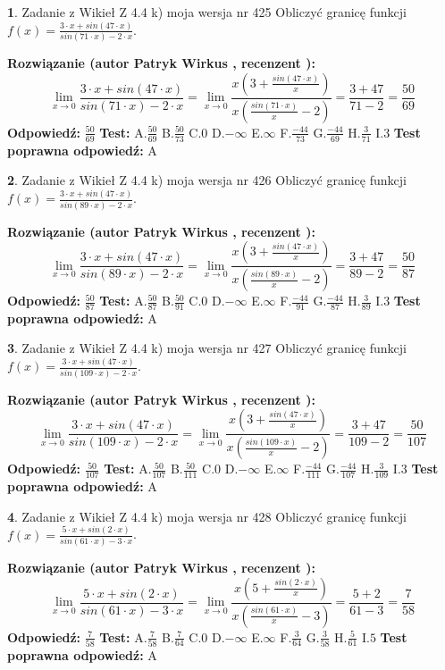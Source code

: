 \documentclass[12pt, a4paper]{article}
\theoremstyle{definition} %
\newtheorem{zad}{}
\newcommand{\zadStart}[1]{\begin{zad}#1\newline}
\newcommand{\zadStop}{\end{zad}}
\newcommand{\rozwStart}[2]{\noindent \textbf{Rozwiązanie (autor #1 , recenzent #2): }\newline}
\newcommand{\rozwStop}{\newline}
\newcommand{\odpStart}{\noindent \textbf{Odpowiedź:}\newline}
\newcommand{\odpStop}{\newline}
\newcommand{\testStart}{\noindent \textbf{Test:}\newline}
\newcommand{\testStop}{\newline}
\newcommand{\kluczStart}{\noindent \textbf{Test poprawna odpowiedź:}\newline}
\newcommand{\kluczStop}{\newline}
\begin{document}
\zadStart{Zadanie z Wikieł Z 4.4 k) moja wersja nr 425}
Obliczyć granicę funkcji $f(x)=\frac{3\cdot x +sin(47\cdot x)}{sin(71\cdot x) -2\cdot x}$.
\zadStop
\rozwStart{Patryk Wirkus}{}
$$\lim\limits_{x\to 0}\frac{3\cdot x +sin(47\cdot x)}{sin(71\cdot x) -2\cdot x}
=\lim\limits_{x\to 0}\frac{x(3+\frac{sin(47\cdot x)}{x})}{x(\frac{sin(71\cdot x)}{x}-2)}
=\frac{3+47}{71-2} = \frac{50}{69}$$
\rozwStop
\odpStart
$\frac{50}{69}$
\odpStop
\testStart
A.$\frac{50}{69}$
B.$\frac{50}{73}$
C.$0$
D.$-\infty$
E.$\infty$
F.$\frac{-44}{73}$
G.$\frac{-44}{69}$
H.$\frac{3}{71}$
I.$3$
\testStop
\kluczStart
A
\kluczStop



\zadStart{Zadanie z Wikieł Z 4.4 k) moja wersja nr 426}
Obliczyć granicę funkcji $f(x)=\frac{3\cdot x +sin(47\cdot x)}{sin(89\cdot x) -2\cdot x}$.
\zadStop
\rozwStart{Patryk Wirkus}{}
$$\lim\limits_{x\to 0}\frac{3\cdot x +sin(47\cdot x)}{sin(89\cdot x) -2\cdot x}
=\lim\limits_{x\to 0}\frac{x(3+\frac{sin(47\cdot x)}{x})}{x(\frac{sin(89\cdot x)}{x}-2)}
=\frac{3+47}{89-2} = \frac{50}{87}$$
\rozwStop
\odpStart
$\frac{50}{87}$
\odpStop
\testStart
A.$\frac{50}{87}$
B.$\frac{50}{91}$
C.$0$
D.$-\infty$
E.$\infty$
F.$\frac{-44}{91}$
G.$\frac{-44}{87}$
H.$\frac{3}{89}$
I.$3$
\testStop
\kluczStart
A
\kluczStop



\zadStart{Zadanie z Wikieł Z 4.4 k) moja wersja nr 427}
Obliczyć granicę funkcji $f(x)=\frac{3\cdot x +sin(47\cdot x)}{sin(109\cdot x) -2\cdot x}$.
\zadStop
\rozwStart{Patryk Wirkus}{}
$$\lim\limits_{x\to 0}\frac{3\cdot x +sin(47\cdot x)}{sin(109\cdot x) -2\cdot x}
=\lim\limits_{x\to 0}\frac{x(3+\frac{sin(47\cdot x)}{x})}{x(\frac{sin(109\cdot x)}{x}-2)}
=\frac{3+47}{109-2} = \frac{50}{107}$$
\rozwStop
\odpStart
$\frac{50}{107}$
\odpStop
\testStart
A.$\frac{50}{107}$
B.$\frac{50}{111}$
C.$0$
D.$-\infty$
E.$\infty$
F.$\frac{-44}{111}$
G.$\frac{-44}{107}$
H.$\frac{3}{109}$
I.$3$
\testStop
\kluczStart
A
\kluczStop



\zadStart{Zadanie z Wikieł Z 4.4 k) moja wersja nr 428}
Obliczyć granicę funkcji $f(x)=\frac{5\cdot x +sin(2\cdot x)}{sin(61\cdot x) -3\cdot x}$.
\zadStop
\rozwStart{Patryk Wirkus}{}
$$\lim\limits_{x\to 0}\frac{5\cdot x +sin(2\cdot x)}{sin(61\cdot x) -3\cdot x}
=\lim\limits_{x\to 0}\frac{x(5+\frac{sin(2\cdot x)}{x})}{x(\frac{sin(61\cdot x)}{x}-3)}
=\frac{5+2}{61-3} = \frac{7}{58}$$
\rozwStop
\odpStart
$\frac{7}{58}$
\odpStop
\testStart
A.$\frac{7}{58}$
B.$\frac{7}{64}$
C.$0$
D.$-\infty$
E.$\infty$
F.$\frac{3}{64}$
G.$\frac{3}{58}$
H.$\frac{5}{61}$
I.$5$
\testStop
\kluczStart
A
\kluczStop
\end{document}
